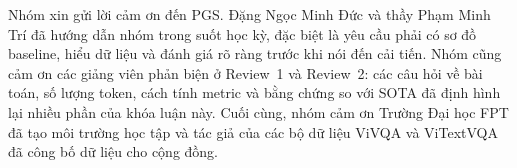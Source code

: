 
\begin{acknowledgements}

Nhóm xin gửi lời cảm ơn đến PGS. Đặng Ngọc Minh Đức và thầy Phạm Minh Trí đã
hướng dẫn nhóm trong suốt học kỳ, đặc biệt là yêu cầu phải có sơ đồ baseline,
hiểu dữ liệu và đánh giá rõ ràng trước khi nói đến cải tiến. Nhóm cũng cảm ơn các
giảng viên phản biện ở Review~1 và Review~2: các câu hỏi về bài toán, số lượng
token, cách tính metric và bằng chứng so với SOTA đã định hình lại nhiều phần
của khóa luận này. Cuối cùng, nhóm cảm ơn Trường Đại học FPT đã tạo môi trường
học tập và tác giả của các bộ dữ liệu ViVQA và ViTextVQA đã công bố dữ liệu cho
cộng đồng.

\end{acknowledgements}
